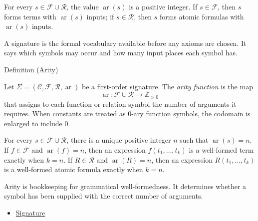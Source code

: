 \begin{remark*}
For every $s\in\mathcal{F}\cup\mathcal{R}$, the value
$\operatorname{ar}(s)$ is a positive integer. If $s\in\mathcal{F}$, then
$s$ forms terms with $\operatorname{ar}(s)$ inputs; if $s\in\mathcal{R}$,
then $s$ forms atomic formulas with $\operatorname{ar}(s)$ inputs.
\end{remark*}

\begin{remark*}[Interpretation]
A signature is the formal vocabulary available before any axioms are chosen.
It says which symbols may occur and how many input places each symbol has.
\end{remark*}

\DefinitionalRoot

\begin{definitionbox}{Definition (Arity)}
\begin{definition}[Arity]
\label{def:arity}
Let $\Sigma=(\mathcal{C},\mathcal{F},\mathcal{R},\operatorname{ar})$ be a
first-order signature. The \emph{arity function} is the map
\[
  \operatorname{ar}:\mathcal{F}\cup\mathcal{R}\to\mathbb{Z}_{>0}
\]
that assigns to each function or relation symbol the number of arguments it
requires. When constants are treated as $0$-ary function symbols, the codomain
is enlarged to include $0$.
\end{definition}
\end{definitionbox}
\begin{remark*}
For every $s\in\mathcal{F}\cup\mathcal{R}$, there is a unique positive
integer $n$ such that $\operatorname{ar}(s)=n$. If $f\in\mathcal{F}$ and
$\operatorname{ar}(f)=n$, then an expression $f(t_1,\ldots,t_k)$ is a
well-formed term exactly when $k=n$. If $R\in\mathcal{R}$ and
$\operatorname{ar}(R)=n$, then an expression $R(t_1,\ldots,t_k)$ is a
well-formed atomic formula exactly when $k=n$.
\end{remark*}

\begin{remark*}[Interpretation]
Arity is bookkeeping for grammatical well-formedness. It determines whether a
symbol has been supplied with the correct number of arguments.
\end{remark*}

\begin{dependencies}
\begin{itemize}
  \item \hyperref[def:signature]{Signature}
\end{itemize}
\end{dependencies}

